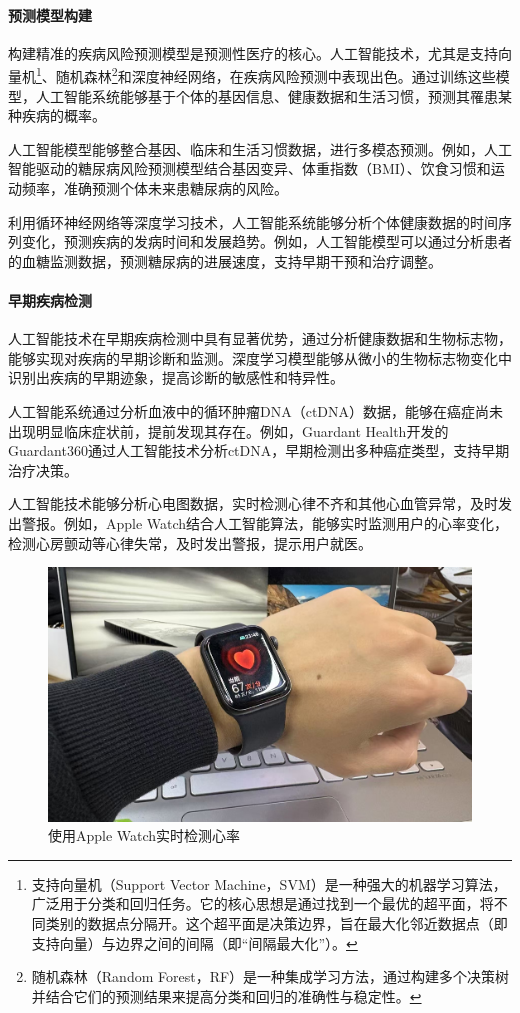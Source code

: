 \paragraph{预测模型构建}

构建精准的疾病风险预测模型是预测性医疗的核心。人工智能技术，尤其是支持向量机\footnote{支持向量机（Support Vector Machine，SVM）是一种强大的机器学习算法，广泛用于分类和回归任务。它的核心思想是通过找到一个最优的超平面，将不同类别的数据点分隔开。这个超平面是决策边界，旨在最大化邻近数据点（即支持向量）与边界之间的间隔（即“间隔最大化”）。}、随机森林\footnote{随机森林（Random Forest，RF）是一种集成学习方法，通过构建多个决策树并结合它们的预测结果来提高分类和回归的准确性与稳定性。}和深度神经网络，在疾病风险预测中表现出色。通过训练这些模型，人工智能系统能够基于个体的基因信息、健康数据和生活习惯，预测其罹患某种疾病的概率。

人工智能模型能够整合基因、临床和生活习惯数据，进行多模态预测。例如，人工智能驱动的糖尿病风险预测模型结合基因变异、体重指数（BMI）、饮食习惯和运动频率，准确预测个体未来患糖尿病的风险。

利用循环神经网络等深度学习技术，人工智能系统能够分析个体健康数据的时间序列变化，预测疾病的发病时间和发展趋势。例如，人工智能模型可以通过分析患者的血糖监测数据，预测糖尿病的进展速度，支持早期干预和治疗调整。

\paragraph{早期疾病检测}

人工智能技术在早期疾病检测中具有显著优势，通过分析健康数据和生物标志物，能够实现对疾病的早期诊断和监测。深度学习模型能够从微小的生物标志物变化中识别出疾病的早期迹象，提高诊断的敏感性和特异性。

人工智能系统通过分析血液中的循环肿瘤DNA（ctDNA）数据，能够在癌症尚未出现明显临床症状前，提前发现其存在。例如，Guardant Health开发的Guardant360通过人工智能技术分析ctDNA，早期检测出多种癌症类型，支持早期治疗决策。

人工智能技术能够分析心电图数据，实时检测心律不齐和其他心血管异常，及时发出警报。例如，Apple Watch结合人工智能算法，能够实时监测用户的心率变化，检测心房颤动等心律失常，及时发出警报，提示用户就医。 

\begin{figure}[ht]
  \centering
  \includegraphics[width=\linewidth]{image/4/apple watch.png}
  \caption{使用Apple Watch实时检测心率}
  \label{fig:apple watch}
\end{figure}

